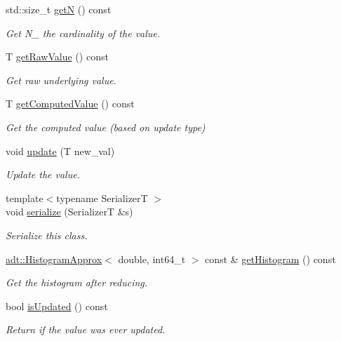 \begin{DoxyCompactItemize}
std\+::size\+\_\+t \hyperlink{structvt_1_1runtime_1_1component_1_1detail_1_1_diagnostic_value_wrapper_a7672933780c70a48654ed26e92a68133}{getN} () const
\begin{DoxyCompactList}\small\item\em Get {\ttfamily N\+\_\+} the cardinality of the value. \end{DoxyCompactList}\item 
T \hyperlink{structvt_1_1runtime_1_1component_1_1detail_1_1_diagnostic_value_wrapper_af1f529fc5c73bf4da10b3d2864f01aa5}{get\+Raw\+Value} () const
\begin{DoxyCompactList}\small\item\em Get raw underlying value. \end{DoxyCompactList}\item 
T \hyperlink{structvt_1_1runtime_1_1component_1_1detail_1_1_diagnostic_value_wrapper_a2f92c4add59b48355d00992acbce55c7}{get\+Computed\+Value} () const
\begin{DoxyCompactList}\small\item\em Get the computed value (based on update type) \end{DoxyCompactList}\item 
void \hyperlink{structvt_1_1runtime_1_1component_1_1detail_1_1_diagnostic_value_wrapper_a492b3859a7654413bf88c1338bdfd643}{update} (T new\+\_\+val)
\begin{DoxyCompactList}\small\item\em Update the value. \end{DoxyCompactList}\item 
{\footnotesize template$<$typename SerializerT $>$ }\\void \hyperlink{structvt_1_1runtime_1_1component_1_1detail_1_1_diagnostic_value_wrapper_a42da2afbb1bc830b6fed0a16fd355b67}{serialize} (SerializerT \&s)
\begin{DoxyCompactList}\small\item\em Serialize this class. \end{DoxyCompactList}\item 
\hyperlink{namespacevt_1_1adt_a486971e142bc22434d6afe695c43b599}{adt\+::\+Histogram\+Approx}$<$ double, int64\+\_\+t $>$ const  \& \hyperlink{structvt_1_1runtime_1_1component_1_1detail_1_1_diagnostic_value_wrapper_a4e9bcb0bcc1ebaf8af3a1c6a3fe786a8}{get\+Histogram} () const
\begin{DoxyCompactList}\small\item\em Get the histogram after reducing. \end{DoxyCompactList}\item 
bool \hyperlink{structvt_1_1runtime_1_1component_1_1detail_1_1_diagnostic_value_wrapper_a081da4e16c553f93666e3c8a00756de1}{is\+Updated} () const
\begin{DoxyCompactList}\small\item\em Return if the value was ever updated. \end{DoxyCompactList}\end{DoxyCompactItemize}
